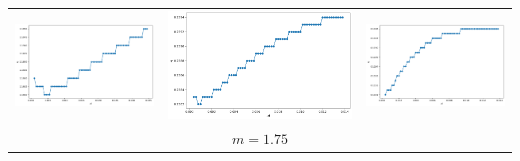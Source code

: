 \documentclass[a4paper,preprint,11pt]{article}
\begin{document}
\begin{table}[ht]
\begin{tabular}{ccc}
    \includegraphics[scale=0.2]{m175e005.png} & \includegraphics[scale=0.2]{m175e001.png} & \includegraphics[scale=0.2]{m175e0005.png}  \\
			& $m=1.75$   &  \\

\end{tabular}
\end{table}
\end{document}
